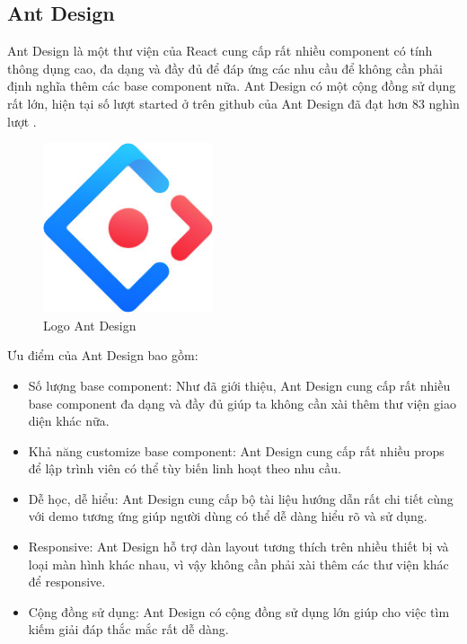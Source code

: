 \subsection{Ant Design}
\hspace*{0.5cm} Ant Design là một thư viện của React cung cấp rất nhiều component có tính thông dụng cao, đa dạng và đầy đủ để đáp ứng các nhu cầu để không cần phải định nghĩa thêm các base component nữa. Ant Design có một cộng đồng sử dụng rất lớn, hiện tại số lượt started ở trên github của Ant Design đã đạt hơn 83 nghìn lượt \cite{technologyAntdStar}.

\begin{figure}[!htp]
    \begin{center}
        \includegraphics[width=5cm]{img/Technology/antd.jpg}
    \end{center}
    \caption{Logo Ant Design \cite{technologyAntd}}
\end{figure}

\hspace*{0.5cm} Ưu điểm của Ant Design bao gồm:
\begin{itemize}
    \item Số lượng base component: Như đã giới thiệu, Ant Design cung cấp rất nhiều base component đa dạng và đầy đủ giúp ta không cần xài thêm thư viện giao diện khác nữa.
    \item Khả năng customize base component: Ant Design cung cấp rất nhiều props để lập trình viên có thể tùy biến linh hoạt theo nhu cầu.
    \item Dễ học, dễ hiểu: Ant Design cung cấp bộ tài liệu hướng dẫn rất chi tiết cùng với demo tương ứng giúp người dùng có thể dễ dàng hiểu rõ và sử dụng.
    \item Responsive: Ant Design hỗ trợ dàn layout tương thích trên nhiều thiết bị và loại màn hình khác nhau, vì vậy không cần phải xài thêm các thư viện khác để responsive.
    \item Cộng đồng sử dụng: Ant Design có cộng đồng sử dụng lớn giúp cho việc tìm kiếm giải đáp thắc mắc rất dễ dàng.
\end{itemize}


